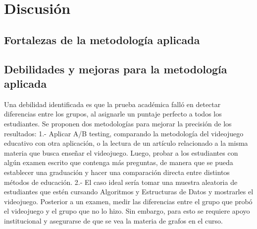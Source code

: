 \chapter{Discusión}



\section{Fortalezas de la metodología aplicada}



\section{Debilidades y mejoras para la metodología aplicada}

Una debilidad identificada es que la prueba académica falló en detectar diferencias entre los grupos, al asignarle un puntaje perfecto a todos los estudiantes. Se proponen dos metodologías para mejorar la precisión de los resultados: 1.- Aplicar A/B testing, comparando la metodología del videojuego educativo con otra aplicación, o la lectura de un artículo relacionado a la misma materia que busca enseñar el videojuego. Luego, probar a los estudiantes con algún examen escrito que contenga más preguntas, de manera que se pueda establecer una graduación y hacer una comparación directa entre distintos métodos de educación. 2.- El caso ideal sería tomar una muestra aleatoria de estudiantes que estén cursando Algoritmos y Estructuras de Datos y mostrarles el videojuego. Posterior a un examen, medir las diferencias entre el grupo que probó el videojuego y el grupo que no lo hizo. Sin embargo, para esto se requiere apoyo institucional y asegurarse de que se vea la materia de grafos en el curso. 

